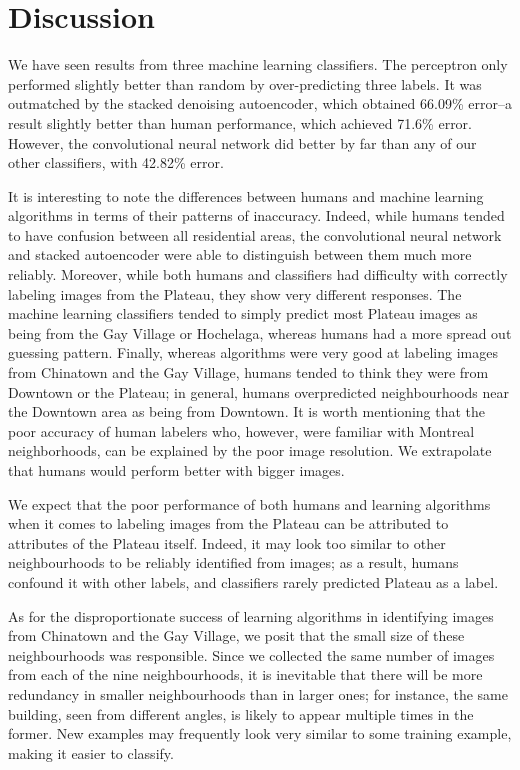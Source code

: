 \documentclass{acm_proc_article-sp}
\begin{document}
\section{Discussion}%
We have seen results from three machine learning classifiers. The perceptron only performed slightly better than random by over-predicting three labels. It was outmatched by the stacked denoising autoencoder, which obtained 66.09\% error--a result slightly better than human performance, which achieved 71.6\% error. However, the convolutional neural network did better by far than any of our other classifiers, with 42.82\% error. 

It is interesting to note the differences between humans and machine learning algorithms in terms of their patterns of inaccuracy. Indeed, while humans tended to have confusion between all residential areas, the convolutional neural network and stacked autoencoder were able to distinguish between them much more reliably.  Moreover, while both humans and classifiers had difficulty with correctly labeling images from the Plateau, they show very different responses. The machine learning classifiers tended to simply predict most Plateau images as being from the Gay Village or Hochelaga, whereas humans had a more spread out guessing pattern. Finally, whereas algorithms were very good at labeling images from Chinatown and the Gay Village, humans tended to think they were from Downtown or the Plateau; in general, humans overpredicted neighbourhoods near the Downtown area as being from Downtown. It is worth mentioning that the poor accuracy of human labelers who, however, were familiar with Montreal neighborhoods, can be explained by the poor image resolution. We extrapolate that humans would perform better with bigger images.

We expect that the poor performance of both humans and learning algorithms when it comes to labeling images from the Plateau can be attributed to attributes of the Plateau itself. Indeed, it may look too similar to other neighbourhoods to be reliably identified from images; as a result, humans confound it with other labels, and classifiers rarely predicted Plateau as a label. 

As for the disproportionate success of learning algorithms in identifying images from Chinatown and the Gay Village, we posit that the small size of these neighbourhoods was responsible. Since we collected the same number of images from each of the nine neighbourhoods, it is inevitable that there will be more redundancy in smaller neighbourhoods than in larger ones; for instance, the same building, seen from different angles, is likely to appear multiple times in the former. New examples may frequently look very similar to some training example, making it easier to classify.
\end{document}
